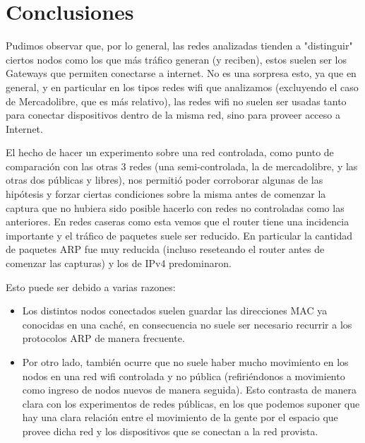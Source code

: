 \documentclass{article}
\theoremstyle{definition}
\theoremstyle{remark}
\begin{document}
\section{Conclusiones}

Pudimos observar que, por lo general, las redes analizadas tienden a "distinguir" ciertos nodos como los que más tráfico generan (y reciben), estos suelen ser los Gateways que permiten conectarse a internet. No es una sorpresa esto, ya que en general, y en particular en los tipos redes wifi que analizamos (excluyendo el caso de Mercadolibre, que es más relativo), las redes wifi no suelen ser usadas tanto para conectar dispositivos dentro de la misma red, sino para proveer acceso a Internet.


El hecho de hacer un experimento sobre una red controlada, como punto de comparación con las otras 3 redes (una semi-controlada, la de mercadolibre, y las otras dos públicas y libres), nos permitió poder corroborar algunas de las hipótesis y forzar ciertas condiciones sobre la misma antes de comenzar la captura que no hubiera sido posible hacerlo con redes no controladas como las anteriores. En redes caseras como esta vemos que el router tiene una incidencia importante y el tráfico de paquetes suele ser reducido. En particular la cantidad de paquetes ARP fue muy reducida (incluso reseteando el router antes de comenzar las capturas) y los de IPv4 predominaron.

Esto puede ser debido a varias razones:
\begin{itemize}
 
\item Los distintos nodos conectados suelen guardar las direcciones MAC ya conocidas en una caché, en consecuencia no suele ser necesario recurrir a los protocolos ARP de manera frecuente.

\item Por otro lado, también ocurre que no suele haber mucho movimiento en los nodos en una red wifi controlada y no pública (refiriéndonos a movimiento como ingreso de nodos nuevos de manera seguida). Esto contrasta de manera clara con los experimentos de redes públicas, en los que podemos suponer que hay una clara relación entre el movimiento de la gente por el espacio que provee dicha red y los dispositivos que se conectan a la red provista.

\end{itemize}


    
\end{document}
